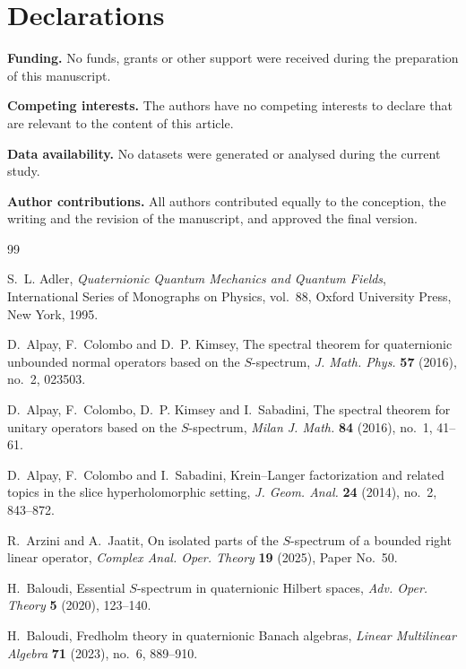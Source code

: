 \documentclass[12pt,a4paper]{article}
\theoremstyle{plain}
\theoremstyle{definition}
\theoremstyle{remark}
\begin{document}
{\section*{Declarations}

\noindent
\textbf{Funding.} No funds, grants or other support were received
during the preparation of this manuscript.

\medskip\noindent
\textbf{Competing interests.} The authors have no competing interests
to declare that are relevant to the content of this article.

\medskip\noindent
\textbf{Data availability.} No datasets were generated or analysed
during the current study.

\medskip\noindent
\textbf{Author contributions.} All authors contributed equally to the
conception, the writing and the revision of the manuscript, and
approved the final version.

\begin{thebibliography}{99}

S.~L. Adler,
\newblock \emph{Quaternionic Quantum Mechanics and Quantum Fields},
\newblock International Series of Monographs on Physics, vol.~88,
Oxford University Press, New York, 1995.

D.~Alpay, F.~Colombo and D.~P. Kimsey,
\newblock The spectral theorem for quaternionic unbounded normal
operators based on the $S$-spectrum,
\newblock \emph{J. Math. Phys.} \textbf{57} (2016), no.~2, 023503.

D.~Alpay, F.~Colombo, D.~P. Kimsey and I.~Sabadini,
\newblock The spectral theorem for unitary operators based on the
$S$-spectrum,
\newblock \emph{Milan J. Math.} \textbf{84} (2016), no.~1, 41--61.

D.~Alpay, F.~Colombo and I.~Sabadini,
\newblock Krein--Langer factorization and related topics in the
slice hyperholomorphic setting,
\newblock \emph{J. Geom. Anal.} \textbf{24} (2014), no.~2, 843--872.

R.~Arzini and A.~Jaatit,
\newblock On isolated parts of the $S$-spectrum of a bounded right
linear operator,
\newblock \emph{Complex Anal. Oper. Theory} \textbf{19} (2025),
Paper No.~50.

H.~Baloudi,
\newblock Essential $S$-spectrum in quaternionic Hilbert spaces,
\newblock \emph{Adv. Oper. Theory} \textbf{5} (2020), 123--140.

H.~Baloudi,
\newblock Fredholm theory in quaternionic Banach algebras,
\newblock \emph{Linear Multilinear Algebra} \textbf{71} (2023), no.~6,
889--910.


\end{thebibliography}}
\end{document}
